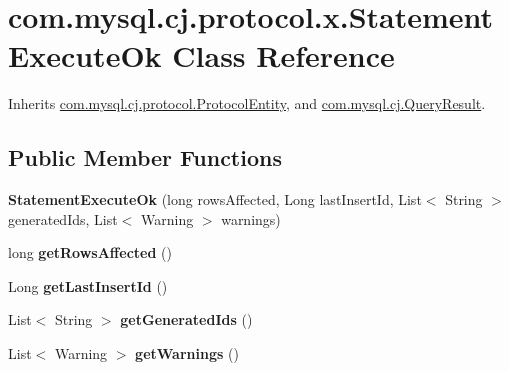 \hypertarget{classcom_1_1mysql_1_1cj_1_1protocol_1_1x_1_1_statement_execute_ok}{}\section{com.\+mysql.\+cj.\+protocol.\+x.\+Statement\+Execute\+Ok Class Reference}
\label{classcom_1_1mysql_1_1cj_1_1protocol_1_1x_1_1_statement_execute_ok}


Inherits \mbox{\hyperlink{interfacecom_1_1mysql_1_1cj_1_1protocol_1_1_protocol_entity}{com.\+mysql.\+cj.\+protocol.\+Protocol\+Entity}}, and \mbox{\hyperlink{interfacecom_1_1mysql_1_1cj_1_1_query_result}{com.\+mysql.\+cj.\+Query\+Result}}.

\subsection*{Public Member Functions}
\begin{DoxyCompactItemize}
\item 
\mbox{\label{classcom_1_1mysql_1_1cj_1_1protocol_1_1x_1_1_statement_execute_ok_a7faa77141adbd06b55260f601712e99e}} 
{\bfseries Statement\+Execute\+Ok} (long rows\+Affected, Long last\+Insert\+Id, List$<$ String $>$ generated\+Ids, List$<$ Warning $>$ warnings)
\item 
\mbox{\label{classcom_1_1mysql_1_1cj_1_1protocol_1_1x_1_1_statement_execute_ok_afa0c398b51fe0eec732949c8ef906be7}} 
long {\bfseries get\+Rows\+Affected} ()
\item 
\mbox{\label{classcom_1_1mysql_1_1cj_1_1protocol_1_1x_1_1_statement_execute_ok_af13aefa68528663f6b90549175eaacca}} 
Long {\bfseries get\+Last\+Insert\+Id} ()
\item 
\mbox{\label{classcom_1_1mysql_1_1cj_1_1protocol_1_1x_1_1_statement_execute_ok_aa751937b760b98e2ce530700d11c70c3}} 
List$<$ String $>$ {\bfseries get\+Generated\+Ids} ()
\item 
\mbox{\label{classcom_1_1mysql_1_1cj_1_1protocol_1_1x_1_1_statement_execute_ok_af4bf2c7891fad1f93648b30d7c3829c2}} 
List$<$ Warning $>$ {\bfseries get\+Warnings} ()
\end{DoxyCompactItemize}


